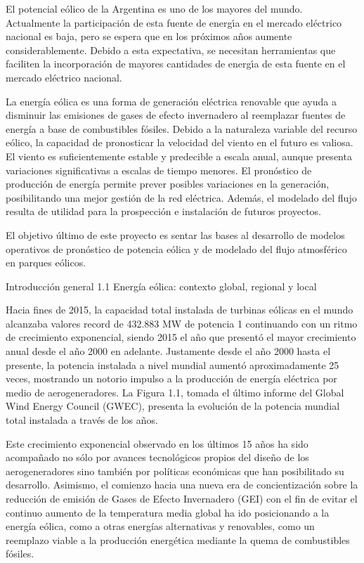 
El potencial eólico de la Argentina es uno de los mayores del mundo. Actualmente la
participación de esta fuente de energı́a en el mercado eléctrico nacional es baja, pero se
espera que en los próximos años aumente considerablemente. Debido a esta expectativa, se
necesitan herramientas que faciliten la incorporación de mayores cantidades de energı́a de
esta fuente en el mercado eléctrico nacional.

La energía eólica es una forma de generación eléctrica renovable que ayuda a disminuir las emisiones de gases de efecto invernadero al reemplazar fuentes de energía a base de combustibles fósiles. Debido a la naturaleza variable del recurso eólico, la capacidad de pronosticar la velocidad del viento en el futuro es valiosa.
El viento es suficientemente estable y predecible a escala anual, aunque presenta variaciones significativas a escalas de tiempo menores. El pronóstico de producción de energía permite prever posibles variaciones en la generación, posibilitando una mejor gestión de la red eléctrica. Además, el modelado del flujo resulta de utilidad para la prospección e instalación de futuros proyectos.

El objetivo último de este proyecto es sentar las bases al desarrollo de modelos operativos
de pronóstico de potencia eólica y de modelado del flujo atmosférico en parques eólicos.


Introducción general
1.1 Energía eólica: contexto global, regional y local

Hacia fines de 2015, la capacidad total instalada de turbinas eólicas en el mundo alcanzaba
valores record de 432.883 MW de potencia 1 continuando con un ritmo de crecimiento
exponencial, siendo 2015 el año que presentó el mayor crecimiento anual desde el año 2000
en adelante. Justamente desde el año 2000 hasta el presente, la potencia instalada a nivel
mundial aumentó aproximadamente 25 veces, mostrando un notorio impulso a la producción
de energía eléctrica por medio de aerogeneradores. La Figura 1.1, tomada el último informe
del Global Wind Energy Council (GWEC), presenta la evolución de la potencia mundial total
instalada a través de los años.


Este crecimiento exponencial observado en los últimos 15 años ha sido acompañado no sólo
por avances tecnológicos propios del diseño de los aerogeneradores sino también por políticas
económicas que han posibilitado su desarrollo. Asimismo, el comienzo hacia una nueva era de
concientización sobre la reducción de emisión de Gases de Efecto Invernadero (GEI) con el fin
de evitar el continuo aumento de la temperatura media global ha ido posicionando a la energía
eólica, como a otras energías alternativas y renovables, como un reemplazo viable a la
producción energética mediante la quema de combustibles fósiles.

